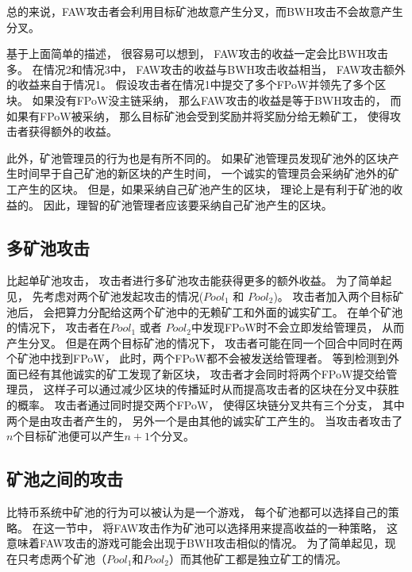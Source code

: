 \documentclass[a4paper, 11pt]{article}
\begin{document}
\begin{CJK*}{UTF8}{gbsn}
    总的来说，FAW攻击者会利用目标矿池故意产生分叉，而BWH攻击不会故意产生分叉。

    基于上面简单的描述，
    很容易可以想到，
    FAW攻击的收益一定会比BWH攻击多。
    在情况2和情况3中，
    FAW攻击的收益与BWH攻击收益相当，
    FAW攻击额外的收益来自于情况1。
    假设攻击者在情况1中提交了多个FPoW并领先了多个区块。
    如果没有FPoW没主链采纳，
    那么FAW攻击的收益是等于BWH攻击的，
    而如果有FPoW被采纳，
    那么目标矿池会受到奖励并将奖励分给无赖矿工，
    使得攻击者获得额外的收益。

    此外，矿池管理员的行为也是有所不同的。
    如果矿池管理员发现矿池外的区块产生时间早于自己矿池的新区块的产生时间，
    一个诚实的管理员会采纳矿池外的矿工产生的区块。
    但是，如果采纳自己矿池产生的区块，
    理论上是有利于矿池的收益的。
    因此，理智的矿池管理者应该要采纳自己矿池产生的区块。

    \subsection{多矿池攻击}

    \indent

    比起单矿池攻击，
    攻击者进行多矿池攻击能获得更多的额外收益。
    为了简单起见，
    先考虑对两个矿池发起攻击的情况($Pool_1$ 和 $Pool_2$)。
    攻击者加入两个目标矿池后，
    会把算力分配给这两个矿池中的无赖矿工和外面的诚实矿工。
    在单个矿池的情况下，
    攻击者在$Pool_1$ 或者 $Pool_2$中发现FPoW时不会立即发给管理员，
    从而产生分叉。
    但是在两个目标矿池的情况下，
    攻击者可能在同一个回合中同时在两个矿池中找到FPoW，
    此时，两个FPoW都不会被发送给管理者。
    等到检测到外面已经有其他诚实的矿工发现了新区块，
    攻击者才会同时将两个FPoW提交给管理员，
    这样子可以通过减少区块的传播延时从而提高攻击者的区块在分叉中获胜的概率。
    攻击者通过同时提交两个FPoW，
    使得区块链分叉共有三个分支，
    其中两个是由攻击者产生的，
    另外一个是由其他的诚实矿工产生的。
    当攻击者攻击了$n$个目标矿池便可以产生$n+1$个分叉。

    \subsection{矿池之间的攻击}

    \indent

    比特币系统中矿池的行为可以被认为是一个游戏，
    每个矿池都可以选择自己的策略。
    在这一节中，
    将FAW攻击作为矿池可以选择用来提高收益的一种策略，
    这意味着FAW攻击的游戏可能会出现于BWH攻击相似的情况\cite{ref_dilemma}。
    为了简单起见，现在只考虑两个矿池（$Pool_1$和$Pool_2$）而其他矿工都是独立矿工的情况。


\end{CJK*}
\end{document}
